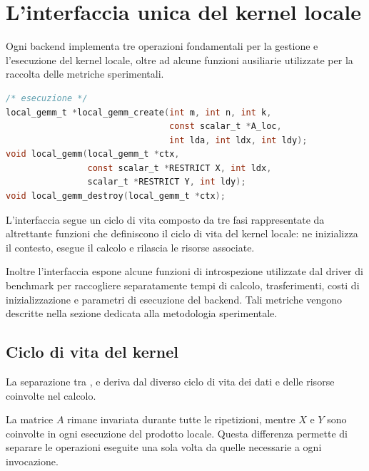 \section{L'interfaccia unica del kernel locale}
\label{sec:interfaccia}

Ogni backend implementa tre operazioni fondamentali per la gestione e l'esecuzione del kernel locale, oltre ad alcune funzioni ausiliarie utilizzate per la raccolta delle metriche sperimentali.

\begin{lstlisting}[language=C,caption={Interfaccia di \file{src/kernel/kernel.h}.}]
/* esecuzione */
local_gemm_t *local_gemm_create(int m, int n, int k,
                                const scalar_t *A_loc,
                                int lda, int ldx, int ldy);
void local_gemm(local_gemm_t *ctx,
                const scalar_t *RESTRICT X, int ldx,
                scalar_t *RESTRICT Y, int ldy);
void local_gemm_destroy(local_gemm_t *ctx);

\end{lstlisting}
\color{red}
L'interfaccia segue un ciclo di vita composto da tre fasi rappresentate da altrettante funzioni che definiscono il ciclo di vita del kernel locale:
 ne inizializza il contesto,
 esegue il calcolo e
 rilascia le risorse associate.
\color{black}


Inoltre l'interfaccia espone alcune funzioni di introspezione utilizzate dal driver di
benchmark per raccogliere separatamente tempi di calcolo, trasferimenti, costi di
inizializzazione e parametri di esecuzione del backend. Tali metriche vengono descritte nella sezione dedicata alla metodologia sperimentale.

\subsection{Ciclo di vita del kernel}
\label{sec:tre-fasi}

La separazione tra ,  e
 deriva dal diverso ciclo di vita dei dati
e delle risorse coinvolte nel calcolo.

La matrice $A$ rimane invariata durante tutte le ripetizioni, mentre
$X$ e $Y$ sono coinvolte in ogni esecuzione del prodotto locale.
Questa differenza permette di separare le operazioni eseguite una sola
volta da quelle necessarie a ogni invocazione.

